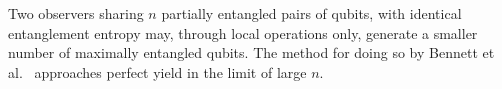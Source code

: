 Two observers sharing $n$ partially entangled pairs of qubits, with identical entanglement entropy may, through local operations only, generate a smaller number of maximally entangled qubits.
The method for doing so by Bennett et al.~\cite{bennett1996concentrating} approaches perfect yield in the limit of large $n$.
